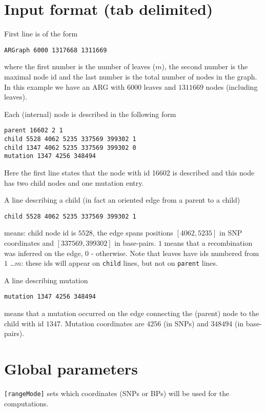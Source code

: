 \documentclass[11pt]{amsart}
\theoremstyle{definition}
\theoremstyle{remark}
\begin{document}
\section{Input format (tab delimited)}

	First line is of the form
	\begin{displayquote}
		\texttt{ARGraph 6000 1317668 1311669}
	\end{displayquote}
	where the first number is the number of leaves ($m$), the second number is the maximal node id and the last number is the total number of nodes in the graph. In this example we have an ARG with $6000$ leaves and $1311669$ nodes (including leaves).

	Each (internal) node is described in the following form
	\begin{displayquote}
		\texttt{parent 16602 2 1\\
			child 5528 4062 5235 337569 399302 1\\
			child 1347 4062 5235 337569 399302 0\\
			mutation 1347 4256 348494}
	\end{displayquote}
	Here the first line states that the node with id 16602 is described and this node has two child nodes and one mutation entry. 

	A line describing a child (in fact an oriented edge from a parent to a child)
	\begin{displayquote}
		\texttt{child 5528 4062 5235 337569 399302 1}
	\end{displayquote}
	means: child node id is $5528$, the edge spans positions $[4062, 5235]$ in SNP coordinates and $[337569, 399302]$ in base-pairs. $1$ means that a recombination was inferred on the edge, $0$ - otherwise. Note that leaves have ids numbered from $1$ \dots $m$: these ids will appear on \texttt{child} lines, but not on \texttt{parent} lines.

	A line describing mutation
	\begin{displayquote}
		\texttt{mutation 1347 4256 348494}
	\end{displayquote}
	means that a mutation occurred on the edge connecting the (parent) node to the child with id $1347$. Mutation coordinates are $4256$ (in SNPs) and $348494$ (in base-pairs).

\section{Global parameters}
	\texttt{[rangeMode]} sets which coordinates (SNPs or BPs) will be used for the computations.
	
\end{document}

